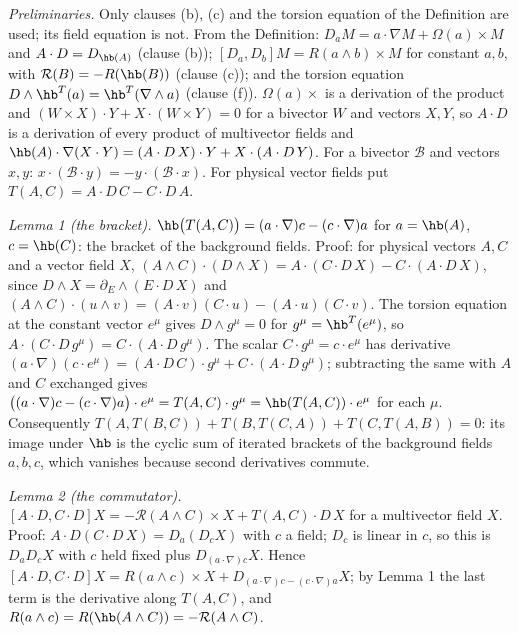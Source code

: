 \emph{Preliminaries.} Only clauses (b), (c) and the torsion equation of the Definition are used; its field equation is not. From the Definition: $D_{a}M = a \cdot \nabla M + \Omega(a) \times M$ and $A \cdot D = D_{\hb(A)}$ (clause (b)); $[D_{a}, D_{b}]M = R(a \wedge b) \times M$ for constant $a, b$, with $\mathcal{R}(B) = -R(\hb(B))$ (clause (c)); and the torsion equation $D \wedge \hb^{T}(a) = \hb^{T}(\nabla \wedge a)$ (clause (f)). $\Omega(a) \times$ is a derivation of the product and $(W \times X) \cdot Y + X \cdot (W \times Y) = 0$ for a bivector $W$ and vectors $X, Y$, so $A \cdot D$ is a derivation of every product of multivector fields and $\hb(A) \cdot \nabla(X \cdot Y) = (A \cdot D\,X) \cdot Y + X \cdot (A \cdot D\,Y)$. For a bivector $\mathcal{B}$ and vectors $x, y$: $x \cdot (\mathcal{B} \cdot y) = -y \cdot (\mathcal{B} \cdot x)$. For physical vector fields put $T(A, C) = A \cdot D\,C - C \cdot D\,A$.

\emph{Lemma 1 (the bracket).} $\hb\bigl(T(A, C)\bigr) = (a \cdot \nabla)c - (c \cdot \nabla)a$ for $a = \hb(A)$, $c = \hb(C)$: the bracket of the background fields. Proof: for physical vectors $A, C$ and a vector field $X$, $(A \wedge C) \cdot (D \wedge X) = A \cdot (C \cdot D\,X) - C \cdot (A \cdot D\,X)$, since $D \wedge X = \partial_{E} \wedge (E \cdot D\,X)$ and $(A \wedge C) \cdot (u \wedge v) = (A \cdot v)(C \cdot u) - (A \cdot u)(C \cdot v)$. The torsion equation at the constant vector $e^{\mu}$ gives $D \wedge g^{\mu} = 0$ for $g^{\mu} = \hb^{T}(e^{\mu})$, so $A \cdot (C \cdot D\,g^{\mu}) = C \cdot (A \cdot D\,g^{\mu})$. The scalar $C \cdot g^{\mu} = c \cdot e^{\mu}$ has derivative $(a \cdot \nabla)(c \cdot e^{\mu}) = (A \cdot D\,C) \cdot g^{\mu} + C \cdot (A \cdot D\,g^{\mu})$; subtracting the same with $A$ and $C$ exchanged gives $\bigl((a \cdot \nabla)c - (c \cdot \nabla)a\bigr) \cdot e^{\mu} = T(A, C) \cdot g^{\mu} = \hb(T(A, C)) \cdot e^{\mu}$ for each $\mu$. Consequently $T(A, T(B, C)) + T(B, T(C, A)) + T(C, T(A, B)) = 0$: its image under $\hb$ is the cyclic sum of iterated brackets of the background fields $a, b, c$, which vanishes because second derivatives commute.

\emph{Lemma 2 (the commutator).} $[A \cdot D, C \cdot D]X = -\mathcal{R}(A \wedge C) \times X + T(A, C) \cdot D\,X$ for a multivector field $X$. Proof: $A \cdot D(C \cdot D\,X) = D_{a}(D_{c}X)$ with $c$ a field; $D_{c}$ is linear in $c$, so this is $D_{a}D_{c}X$ with $c$ held fixed plus $D_{(a \cdot \nabla)c}X$. Hence $[A \cdot D, C \cdot D]X = R(a \wedge c) \times X + D_{(a \cdot \nabla)c - (c \cdot \nabla)a}X$; by Lemma 1 the last term is the derivative along $T(A, C)$, and $R(a \wedge c) = R(\hb(A \wedge C)) = -\mathcal{R}(A \wedge C)$.

